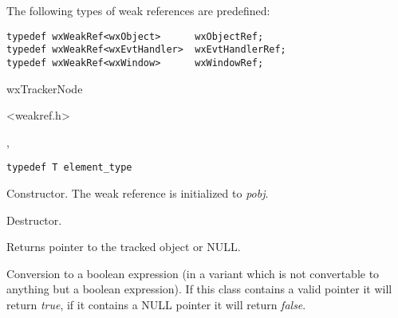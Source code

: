 
The following types of weak references are predefined: 

\begin{verbatim}
typedef wxWeakRef<wxObject>      wxObjectRef;
typedef wxWeakRef<wxEvtHandler>  wxEvtHandlerRef;
typedef wxWeakRef<wxWindow>      wxWindowRef;
\end{verbatim}



wxTrackerNode


<weakref.h>


, 


{\small%
\begin{verbatim}
typedef T element_type
\end{verbatim}
}%




\label{wxweakrefwxweakref}


Constructor. The weak reference is initialized to {\it pobj}.


\label{wxweakrefdtor}


Destructor.


\label{wxweakrefget}


Returns pointer to the tracked object or NULL.

\label{wxweakrefoperatorbool}


Conversion to a boolean expression (in a variant which is not 
convertable to anything but a boolean expression). If this class
contains a valid pointer it will return {\it true}, if it contains
a NULL pointer it will return {\it false}.


\label{wxweakrefoperatorreft}

